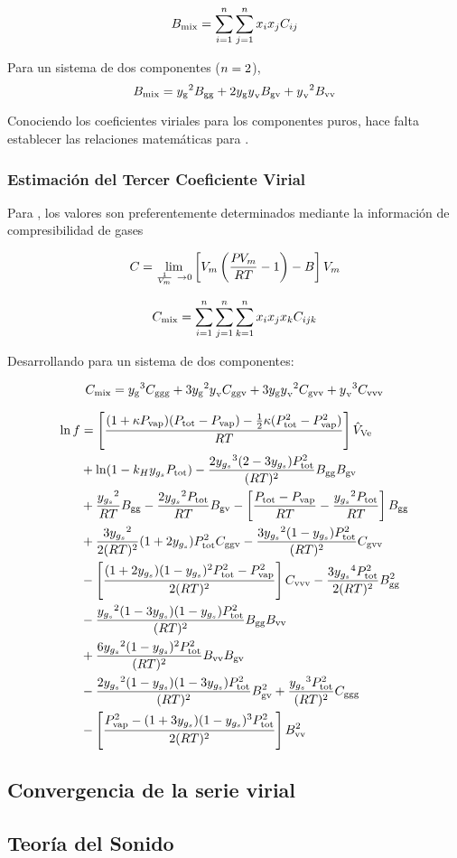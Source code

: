 \begin{equation}
   B_{\text{mix}}{} = \sum_{i=1}^{n} \sum_{j=1}^{n} x_i x_j C_{ij} {}
\end{equation}

Para un sistema de dos componentes ($n = 2$),
\begin{equation}
   B_{\text{mix}}{} = {{y_{{\text{g}}}}}^2 B_{{\text{g}} {\text{g}}} + 2 {{y_{{\text{g}}}}} {y_{}}_{{\text{v}}} B_{{\text{g}} {\text{v}}} + {{y_{}}_{{\text{v}}}}^2 B_{{\text{v}} {\text{v}}}{}
\end{equation}
\eqSecondVirialCoeffNaming{}

Conociendo los coeficientes viriales para los componentes puros, hace falta establecer las relaciones matemáticas para {\bCoeffVirial{\nameG \nameV}}.



\subsubsection{Estimación del Tercer Coeficiente Virial}
Para \parencite{Dymond2002}, los valores son preferentemente determinados mediante la información de compresibilidad de gases 

\begin{equation}
  \cCoeffVirial{} = \lim_{\frac{1}{\Vm}\ \to {0}} \left[ \Vm \left(\frac{\P{} \Vm} {\UnivConstantGas \T{}} - 1 \right) - \bCoeffVirial{} \right] \Vm
\end{equation}


\begin{equation}
   C_{\text{mix}}{} = \sum_{i=1}^{n} \sum_{j=1}^{n} \sum_{k=1}^{n} x_i x_j x_k C_{ijk} {}
\end{equation}

Desarrollando para un sistema de dos componentes:

\begin{equation}
   C_{\text{mix}}{} = {{y_{{\text{g}}}}}^3 C_{{\text{g}} {\text{g}} {\text{g}}} + 3{{y_{{\text{g}}}}}^2 {{y_{}}_{{\text{v}}}} C_{{\text{g}} {\text{g}} {\text{v}}} + 3 {{y_{{\text{g}}}}} {{y_{}}_{{\text{v}}}}^2 C_{{\text{g}} {\text{v}} {\text{v}}} + {{y_{}}_{{\text{v}}}}^3 C_{{\text{v}} {\text{v}} {\text{v}}}{}
\end{equation}

\eqThirdVirialCoeffNaming{}

\figVirialBCBehavior

\begin{align}
  \eqVirialFactorCorrection{}
\end{align}

\factorCorrectionNaming{}

\subsection{Convergencia de la serie virial}

\subsection{Teoría del Sonido}
